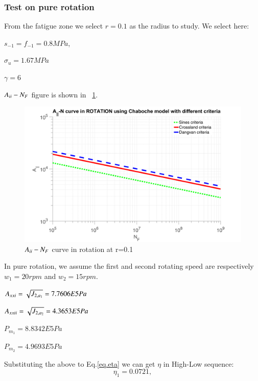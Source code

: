 \documentclass[3p,times,procedia,number]{elsarticle}
\newcommand{\figref}[1]{\figurename~\ref{#1}}
\begin{document}
\newpage
\subsubsection{Test on pure rotation}

From the fatigue zone we select $r=0.1$ as the radius to study. We select here:

$s_{-1}=f_{-1}=0.8MPa$,

$\sigma_{u}=1.67MPa$ 

$\gamma=6$


$A_{\uppercase\expandafter{\romannumeral2}}-N_F$ figure is shown in \figref{JNrotation}. 
\begin{figure}[h!]
	\centering
	\includegraphics[width=\textwidth]{figures//JNrotation.png} 
	\caption{$A_{\uppercase\expandafter{\romannumeral2}}-N_F$ curve in rotation at r=0.1}
	\label{JNrotation}
\end{figure}

In pure rotation, we assume the first and second rotating speed are respectively $w_1=20rpm$ and $w_2=15rpm$.  

\vspace{6pt}
$A_{\uppercase\expandafter{\romannumeral2}1}=\sqrt{J_{2,a_1}}=7.7606E5 Pa$

\vspace{6pt}
$A_{\uppercase\expandafter{\romannumeral2}2}=\sqrt{J_{2,a_2}}=4.3653E5 Pa$

\vspace{6pt}
$P_{m_1}=8.8342E5 Pa$

\vspace{6pt}
$P_{m_2}=4.9693E5 Pa$

Substituting the above to Eq.\eqref{eq.eta} we can get $\eta$ in High-Low sequence:
$$\eta_1=0.0721,$$
\end{document}
